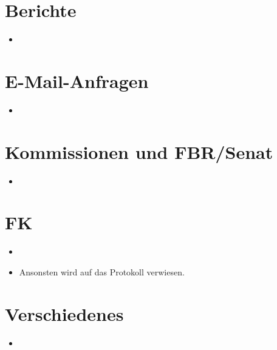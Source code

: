 

\renewcommand{\protokolldatum}{dd.mm.2014}
\renewcommand{\protokollbeginn}{hh:mm Uhr}
\renewcommand{\protokollende}{hh:mm Uhr}
\renewcommand{\protokollant}{Protokollant}
\renewcommand{\protokollanwesend}{Namen}
\renewcommand{\protokollfehlend}{Namen}


\protokolltitlepage

\section{Berichte}
\begin{itemize}
	\item 
\end{itemize}

\section{E-Mail-Anfragen}
\begin{itemize}
	\item 
\end{itemize}

\section{Kommissionen und FBR/Senat}
\begin{itemize}
	\item 
\end{itemize}

\section{FK}
\begin{itemize}
	\item 
	\item Ansonsten wird auf das Protokoll verwiesen.
\end{itemize}

\section{Verschiedenes}
\begin{itemize}
	\item 
\end{itemize}



